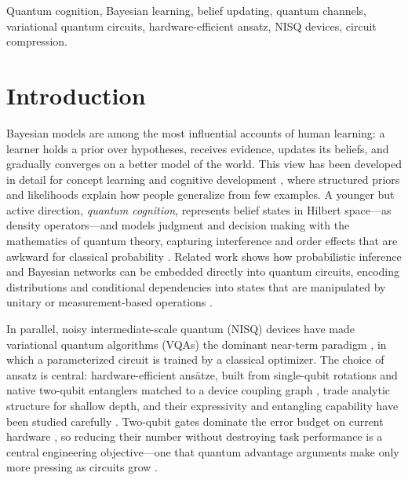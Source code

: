 \documentclass[conference]{IEEEtran}
\begin{document}
\begin{IEEEkeywords}
Quantum cognition, Bayesian learning, belief updating, quantum channels, variational
quantum circuits, hardware-efficient ansatz, NISQ devices, circuit compression.
\end{IEEEkeywords}

\section{Introduction}

Bayesian models are among the most influential accounts of human learning: a learner
holds a prior over hypotheses, receives evidence, updates its beliefs, and gradually
converges on a better model of the world. This view has been developed in detail for
concept learning and cognitive development \cite{b1,b2,b11}, where structured priors and
likelihoods explain how people generalize from few examples. A younger but active
direction, \emph{quantum cognition}, represents belief states in Hilbert space---as
density operators---and models judgment and decision making with the mathematics of
quantum theory, capturing interference and order effects that are awkward for classical
probability \cite{b3}. Related work shows how probabilistic inference and Bayesian
networks can be embedded directly into quantum circuits, encoding distributions and
conditional dependencies into states that are manipulated by unitary or measurement-based
operations \cite{b8,b9}.

In parallel, noisy intermediate-scale quantum (NISQ) devices \cite{b7} have made
variational quantum algorithms (VQAs) the dominant near-term paradigm \cite{b6}, in which
a parameterized circuit is trained by a classical optimizer. The choice of ansatz is
central: hardware-efficient ans\"atze, built from single-qubit rotations and native
two-qubit entanglers matched to a device coupling graph \cite{b4}, trade analytic
structure for shallow depth, and their expressivity and entangling capability have been
studied carefully \cite{b5,b27}. Two-qubit gates dominate the error budget on current
hardware \cite{b7,b10}, so reducing their number without destroying task performance is a
central engineering objective---one that quantum advantage arguments make only more
pressing as circuits grow \cite{b20,b21}.
\end{document}

